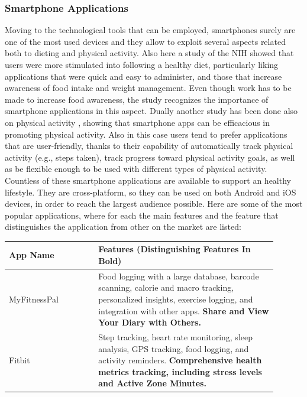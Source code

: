 \subsubsection{Smartphone Applications} %
Moving to the technological tools that can be employed, smartphones surely are one of the most used devices and they allow to exploit several aspects related both to dieting and physical activity. Also here a study of the NIH \cite{NihSmartphoneDieting} showed that users were more stimulated into following a healthy diet, particularly liking applications that were quick and easy to administer, and those that increase awareness of food intake and weight management. Even though work has to be made to increase food awareness, the study recognizes the importance of smartphone applications in this aspect. Dually another study has been done also on physical activity \cite{NihSmartphonePhysicalActivity}, showing that smartphone apps can be efficacious in promoting physical activity. Also in this case users tend to prefer applications that are user-friendly, thanks to their capability of automatically track physical activity (e.g., steps taken), track progress toward physical activity goals, as well as be flexible enough to be used with different types of physical activity. Countless of these smartphone applications are available to support an healthy lifestyle. They are cross-platform, so they can be used on both Android and iOS devices, in order to reach the largest audience possible. Here are some of the most popular applications, where for each the main features and the feature that distinguishes the application from other on the market are listed:
\begin{table}[h!]
    \centering
    \begin{tabular}{|>{\raggedright\arraybackslash}p{0.3\linewidth}|>{\raggedright\arraybackslash}p{0.6\linewidth}|}
        \hline
        \textbf{App Name} & \textbf{Features (Distinguishing Features In Bold)}                                                                                                                                                                                              \\
        \hline
        MyFitnessPal      & Food logging with a large database, barcode scanning, calorie and macro tracking, personalized insights, exercise logging, and integration with other apps. \textbf{Share and View Your Diary with Others.} \\
        \hline
        Fitbit            & Step tracking, heart rate monitoring, sleep analysis, GPS tracking, food logging, and activity reminders. \textbf{Comprehensive health metrics tracking, including stress levels and Active Zone Minutes.}                                       \\
        \hline
    \end{tabular}
\end{table}

